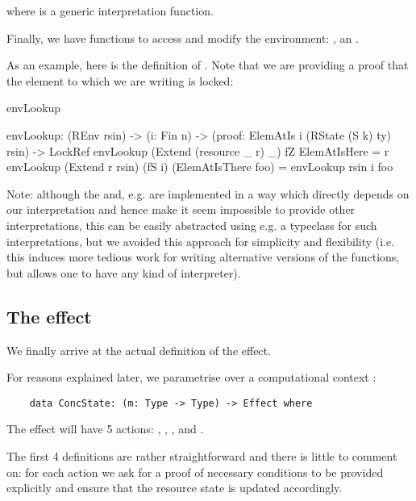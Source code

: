 where  is a generic interpretation function.

Finally, we have functions to access and modify the environment:
,  an .

As an example, here is the definition of . Note that we are
providing a proof that the element to which we are writing is locked:

\begin{SaveVerbatim}{envLookup}

    envLookup: (REnv rsin) -> (i: Fin n) ->
        (proof: ElemAtIs i (RState (S k) ty) rsin) -> LockRef
    envLookup (Extend (resource _ r) _) fZ ElemAtIsHere =
        r
    envLookup (Extend r rsin) (fS i) (ElemAtIsThere foo) =
        envLookup rsin i foo

\end{SaveVerbatim}

Note: although the  and, e.g.  are implemented in a
way which directly depends on our  interpretation and hence
make it seem impossible to provide other interpretations, this can be easily
abstracted using e.g. a typeclass for such interpretations, but we avoided this
approach for simplicity and flexibility (i.e. this induces more tedious work
for writing alternative versions of the  functions, but allows one
to have any kind of interpreter).

\subsection{The effect}

We finally arrive at the actual definition of the  effect.

For reasons explained later, we parametrise  over a
computational context :

\begin{verbatim}
    data ConcState: (m: Type -> Type) -> Effect where
\end{verbatim}

The effect will have 5 actions: , , ,
 and .

The first 4 definitions are rather straightforward and there is little to
comment on: for each action we ask for a proof of necessary conditions to be
provided explicitly and ensure that the resource state is updated accordingly.

